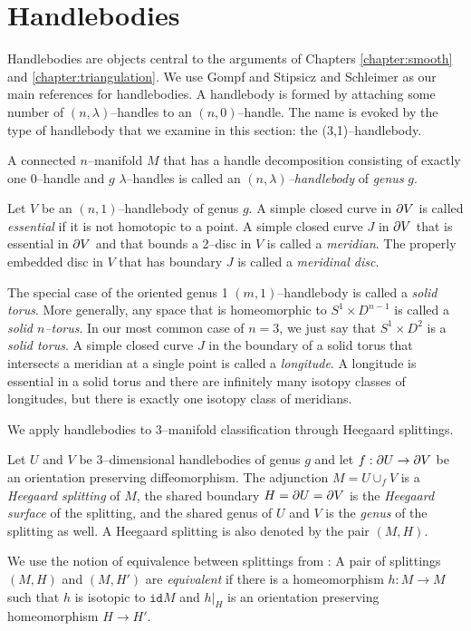 \section{Handlebodies}
\label{section:problem-handlebodies}

Handlebodies are objects central to the arguments of Chapters \ref{chapter:smooth} and \ref{chapter:triangulation}.
We use Gompf and Stipsicz \cite{GompStip} and Schleimer \cite{SchlWald} as our main references for handlebodies.
A handlebody is formed by attaching some number of $(n,\lambda)$--handles to an $(n,0)$--handle.
The name is evoked by the type of handlebody that we examine in this section: the (3,1)--handlebody.

\begin{defn}
	A connected $n$--manifold $M$ that has a handle decomposition consisting of exactly one 0--handle and $g$ $\lambda$--handles is called an \emph{$(n,\lambda)$--handlebody} of \emph{genus} $g$.
	
	Let $V$ be an $(n,1)$--handlebody of genus $g$.
	A simple closed curve in $\partial V$ is called \emph{essential} if it is not homotopic to a point.
	A simple closed curve $J$ in $\partial V$ that is essential in $\partial V$ and that bounds a 2--disc in $V$ is called a \emph{meridian}.
	The properly embedded disc in $V$ that has boundary $J$ is called a \emph{meridinal disc}.
	
	The special case of the oriented genus 1 $(m,1)$--handlebody is called a \emph{solid torus}.
	More generally, any space that is homeomorphic to $S^1\times D^{n-1}$ is called a \emph{solid $n$--torus}.
	In our most common case of $n=3$, we just say that $S^1\times D^2$ is a \emph{solid torus}.
	A simple closed curve $J$ in the boundary of a solid torus that intersects a meridian at a single point is called a \emph{longitude}.
	A longitude is essential in a solid torus and there are infinitely many isotopy classes of longitudes, but there is exactly one isotopy class of meridians.
\end{defn}

We apply handlebodies to 3--manifold classification through Heegaard splittings.

\begin{defn}	
	Let $U$ and $V$ be 3--dimensional handlebodies of genus $g$ and let $f:\partial U\to \partial V$ be an orientation preserving diffeomorphism.
	The adjunction $M=U\cup_f V$ is a \emph{Heegaard splitting} of $M$, the shared boundary $H = \partial U = \partial V$ is the \emph{Heegaard surface} of the splitting, and the shared genus of $U$ and $V$ is the \emph{genus} of the splitting as well.
	A Heegaard splitting is also denoted by the pair $(M,H)$.
	
	We use the notion of equivalence between splittings from \cite{SchlWald}:
	A pair of splittings $(M,H)$ and $(M,H')$ are \emph{equivalent} if there is a homeomorphism $h:M\to M$ such that $h$ is isotopic to $\texttt{id}M$ and $h|_H$ is an orientation preserving homeomorphism $H\to H'$.
\end{defn}

